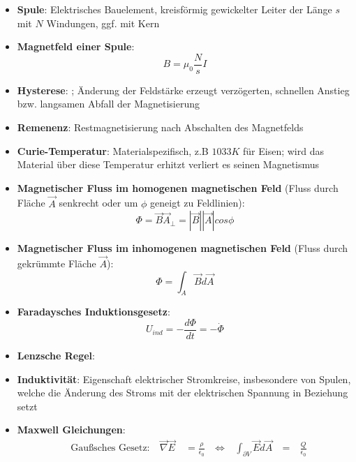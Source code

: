 \begin{itemize}
	\item \textbf{Spule}: Elektrisches Bauelement, kreisförmig gewickelter Leiter der Länge $s$ mit $N$ Windungen, ggf. mit Kern
	\item \textbf{Magnetfeld einer Spule}:
	\begin{equation}
		B = \mu_0\frac{N}{s}I
	\end{equation}
	\item \textbf{Hysterese}: ; Änderung der Feldstärke erzeugt verzögerten, schnellen Anstieg bzw. langsamen Abfall der Magnetisierung
	\item \textbf{Remenenz}: Restmagnetisierung nach Abschalten des Magnetfelds
	\item \textbf{Curie-Temperatur}: Materialspezifisch, z.B $1033K$ für Eisen; wird das Material über diese Temperatur erhitzt verliert es seinen Magnetismus
	\item \textbf{Magnetischer Fluss im homogenen magnetischen Feld} (Fluss durch Fläche $\vec{A}$ senkrecht oder um $\phi$ geneigt zu Feldlinien):
	\begin{equation}
		\Phi = \vec{B}\vec{A}_\perp = |\vec{B}||\vec{A}|cos\phi
	\end{equation}
	\item \textbf{Magnetischer Fluss im inhomogenen magnetischen Feld} (Fluss durch gekrümmte Fläche $\vec{A}$):
	\begin{equation}
		\Phi = \int_A \vec{B}d\vec{A}
	\end{equation}
	\item \textbf{Faradaysches Induktionsgesetz}:
	\begin{equation}
		U_{ind} = -\frac{d\Phi}{dt} = -\dot{\Phi}
	\end{equation}
	\item \textbf{Lenzsche Regel}: 
	\item \textbf{Induktivität}: Eigenschaft elektrischer Stromkreise, insbesondere von Spulen, welche die Änderung des Stroms mit der elektrischen Spannung in Beziehung setzt
	\item \textbf{Maxwell Gleichungen}:
	\begin{align*}
		&\text{Gaußsches Gesetz:}\ &
		\vec{\nabla}\vec{E} &\ = \frac{\rho}{\epsilon_0}
		&\ \Leftrightarrow\ & \int_{\partial V}\vec{E}d\vec{A} &\ =\ & \frac{Q}{\epsilon_0}\\

\end{align*}
\end{itemize}

